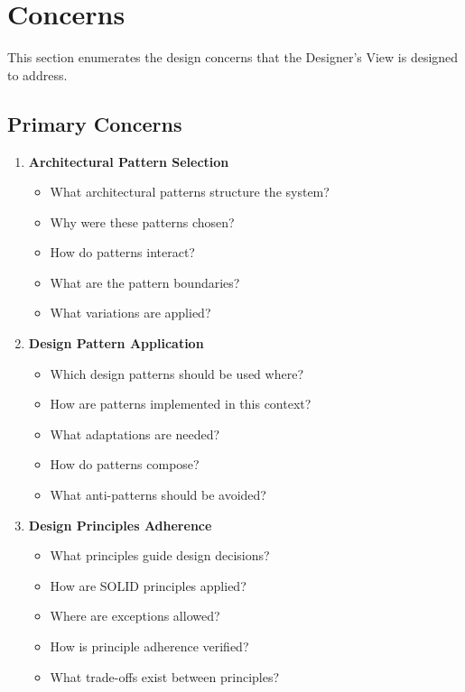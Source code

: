 \documentclass[11pt,letterpaper]{article}
\begin{document}
\section{Concerns}

This section enumerates the design concerns that the Designer's View is designed to address.

\subsection{Primary Concerns}

\begin{enumerate}[label=\textbf{C\arabic*:}, leftmargin=2.5em]
    \item \textbf{Architectural Pattern Selection}
    \begin{itemize}[nosep]
        \item What architectural patterns structure the system?
        \item Why were these patterns chosen?
        \item How do patterns interact?
        \item What are the pattern boundaries?
        \item What variations are applied?
    \end{itemize}
    
    \item \textbf{Design Pattern Application}
    \begin{itemize}[nosep]
        \item Which design patterns should be used where?
        \item How are patterns implemented in this context?
        \item What adaptations are needed?
        \item How do patterns compose?
        \item What anti-patterns should be avoided?
    \end{itemize}
    
    \item \textbf{Design Principles Adherence}
    \begin{itemize}[nosep]
        \item What principles guide design decisions?
        \item How are SOLID principles applied?
        \item Where are exceptions allowed?
        \item How is principle adherence verified?
        \item What trade-offs exist between principles?
    \end{itemize}
    

\end{enumerate}
\end{document}
